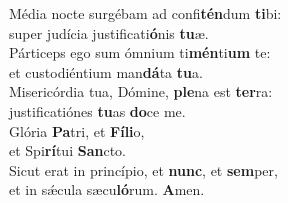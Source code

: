 \evenverse Média nocte surgébam ad confi\textbf{tén}dum \textbf{ti}bi:~\*\\
\evenverse super judícia justificati\textbf{ó}nis \textbf{tu}æ.\\
\oddverse Párticeps ego sum ómnium ti\textbf{mén}ti\textbf{um} te:~\*\\
\oddverse et custodiéntium man\textbf{dá}ta \textbf{tu}a.\\
\evenverse Misericórdia tua, Dómine, \textbf{ple}na est \textbf{ter}ra:~\*\\
\evenverse justificatiónes \textbf{tu}as \textbf{do}ce me.\\
\oddverse Glória \textbf{Pa}tri, et \textbf{Fí}\textbf{li}o,~\*\\
\oddverse et Spi\textbf{rí}tui \textbf{San}cto.\\
\evenverse Sicut erat in princípio, et \textbf{nunc}, et \textbf{sem}per,~\*\\
\evenverse et in sǽcula sæcu\textbf{ló}rum. \textbf{A}men.\\
